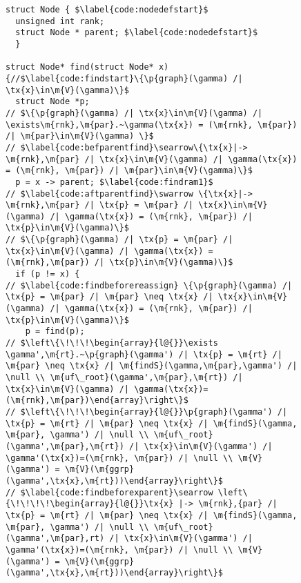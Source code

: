\begin{figure}[t]
\vspace{-1ex}
  \begin{lstlisting}
struct Node { $\label{code:nodedefstart}$
  unsigned int rank;
  struct Node * parent; $\label{code:nodedefstart}$
  }

struct Node* find(struct Node* x) {//$\label{code:findstart}\{\p{graph}(\gamma) /| \tx{x}\in\m{V}(\gamma)\}$
  struct Node *p;
// $\{\p{graph}(\gamma) /| \tx{x}\in\m{V}(\gamma) /| \exists\m{rnk},\m{par}.~\gamma(\tx{x}) = (\m{rnk}, \m{par}) /| \m{par}\in\m{V}(\gamma) \}$
// $\label{code:befparentfind}\searrow\{\tx{x}|-> \m{rnk},\m{par} /| \tx{x}\in\m{V}(\gamma) /| \gamma(\tx{x}) = (\m{rnk}, \m{par}) /| \m{par}\in\m{V}(\gamma)\}$
  p = x -> parent; $\label{code:findram1}$
// $\label{code:aftparentfind}\swarrow \{\tx{x}|-> \m{rnk},\m{par} /| \tx{p} = \m{par} /| \tx{x}\in\m{V}(\gamma) /| \gamma(\tx{x}) = (\m{rnk}, \m{par}) /| \tx{p}\in\m{V}(\gamma)\}$
// $\{\p{graph}(\gamma) /| \tx{p} = \m{par} /| \tx{x}\in\m{V}(\gamma) /| \gamma(\tx{x}) = (\m{rnk},\m{par}) /| \tx{p}\in\m{V}(\gamma)\}$ 
  if (p != x) {
// $\label{code:findbeforereassign} \{\p{graph}(\gamma) /| \tx{p} = \m{par} /| \m{par} \neq \tx{x} /| \tx{x}\in\m{V}(\gamma) /| \gamma(\tx{x}) = (\m{rnk}, \m{par}) /| \tx{p}\in\m{V}(\gamma)\}$
    p = find(p); 
// $\left\{\!\!\!\begin{array}{l@{}}\exists \gamma',\m{rt}.~\p{graph}(\gamma') /| \tx{p} = \m{rt} /| \m{par} \neq \tx{x} /| \m{findS}(\gamma,\m{par},\gamma') /| \null \\ \m{uf\_root}(\gamma',\m{par},\m{rt}) /| \tx{x}\in\m{V}(\gamma) /| \gamma(\tx{x})=(\m{rnk},\m{par})\end{array}\right\}$
// $\left\{\!\!\!\begin{array}{l@{}}\p{graph}(\gamma') /| \tx{p} = \m{rt} /| \m{par} \neq \tx{x} /| \m{findS}(\gamma, \m{par}, \gamma') /| \null \\ \m{uf\_root}(\gamma',\m{par},\m{rt}) /| \tx{x}\in\m{V}(\gamma') /| \gamma'(\tx{x})=(\m{rnk}, \m{par}) /| \null \\ \m{V}(\gamma') = \m{V}(\m{ggrp}(\gamma',\tx{x},\m{rt}))\end{array}\right\}$
// $\label{code:findbeforexparent}\searrow \left\{\!\!\!\!\begin{array}{l@{}}\tx{x} |-> \m{rnk},{par} /| \tx{p} = \m{rt} /| \m{par} \neq \tx{x} /| \m{findS}(\gamma, \m{par}, \gamma') /| \null \\ \m{uf\_root}(\gamma',\m{par},rt) /| \tx{x}\in\m{V}(\gamma') /| \gamma'(\tx{x})=(\m{rnk}, \m{par}) /| \null \\ \m{V}(\gamma') = \m{V}(\m{ggrp}(\gamma',\tx{x},\m{rt}))\end{array}\right\}$

\end{lstlisting}
\end{figure}
